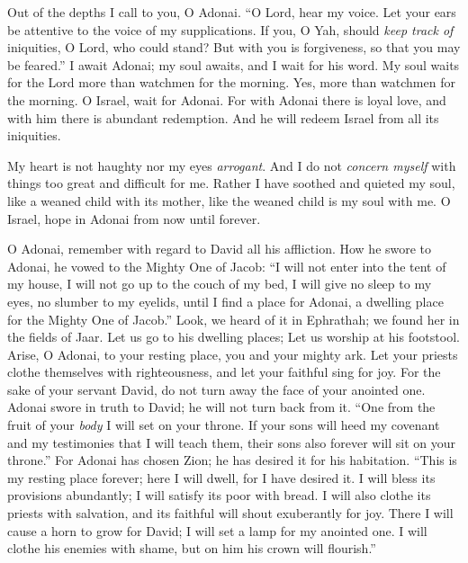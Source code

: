 \begin{biblechapter} %
 Out of the depths I call to you, O Adonai.
\verse “O Lord, hear my voice. 
Let your ears be attentive 
to the voice of my supplications.
\verse If you, O Yah, should \textit{keep track of} iniquities, 
O Lord, who could stand?
\verse But with you is forgiveness, 
so that you may be feared.”
\verse I await Adonai; my soul awaits, 
and I wait for his word.
\verse My soul waits for the Lord 
more than watchmen for the morning. 
Yes, more than watchmen for the morning.
\verse O Israel, wait for Adonai. 
For with Adonai there is loyal love, 
and with him there is abundant redemption.
\verse And he will redeem Israel 
from all its iniquities.
\end{biblechapter}

\begin{biblechapter} %
 My heart is not haughty nor my eyes \textit{arrogant}. 
And I do not \textit{concern myself} 
with things too great and difficult for me.
\verse Rather I have soothed and quieted my soul, 
like a weaned child with its mother, 
like the weaned child is my soul with me.
\verse O Israel, hope in Adonai 
from now until forever.
\end{biblechapter}

\begin{biblechapter} %
 O Adonai, remember with regard to David 
all his affliction.
\verse How he swore to Adonai, 
he vowed to the Mighty One of Jacob:
\verse “I will not enter into the tent of my house, 
I will not go up to the couch of my bed,
\verse I will give no sleep to my eyes, 
no slumber to my eyelids,
\verse until I find a place for Adonai, 
a dwelling place for the Mighty One of Jacob.”
\verse Look, we heard of it in Ephrathah; 
we found her in the fields of Jaar.
\verse Let us go to his dwelling places; 
Let us worship at his footstool.
\verse Arise, O Adonai, to your resting place, 
you and your mighty ark.
\verse Let your priests clothe themselves with righteousness, 
and let your faithful sing for joy.
\verse For the sake of your servant David, 
do not turn away the face of your anointed one.
\verse Adonai swore in truth to David; 
he will not turn back from it. 
“One from the fruit of your \textit{body} 
I will set on your throne.
\verse If your sons will heed my covenant 
and my testimonies that I will teach them, 
their sons also forever 
will sit on your throne.”
\verse For Adonai has chosen Zion; 
he has desired it for his habitation.
\verse “This is my resting place forever; 
here I will dwell, for I have desired it.
\verse I will bless its provisions abundantly; 
I will satisfy its poor with bread.
\verse I will also clothe its priests with salvation, 
and its faithful will shout exuberantly for joy.
\verse There I will cause a horn to grow for David; 
I will set a lamp for my anointed one.
\verse I will clothe his enemies with shame, 
but on him his crown will flourish.”
\end{biblechapter}

